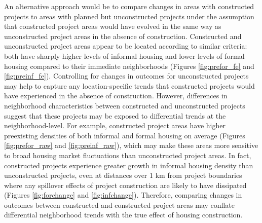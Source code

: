 \documentclass[12pt]{article}
\begin{document}
An alternative approach would be to compare changes in areas with constructed projects to areas with planned but unconstructed projects under the assumption that constructed project areas would have evolved in the same way as unconstructed project areas in the absence of construction.  Constructed and unconstructed project areas appear to be located according to similar criteria: both have sharply higher levels of informal housing and lower levels of formal housing compared to their immediate neighborhoods (Figures \ref{fig:prefor_fe} and \ref{fig:preinf_fe}).  Controlling for changes in outcomes for unconstructed projects may help to capture any location-specific trends that constructed projects would have experienced in the absence of construction.  However,  differences in neighborhood characteristics between constructed and unconstructed projects suggest that these projects may be exposed to differential trends at the neighborhood-level.  For example, constructed project areas have higher preexisting densities of both informal and formal housing on average (Figures \ref{fig:prefor_raw} and \ref{fig:preinf_raw}), which may make these areas more sensitive to broad housing market fluctuations than unconstructed project areas.  In fact, constructed projects experience greater growth in informal housing density than unconstructed projects, even at distances over 1 km from project boundaries where any spillover effects of project construction are likely to have dissipated (Figures \ref{fig:forchange} and \ref{fig:infchange}).  Therefore, comparing changes in outcomes between constructed and constructed project areas may conflate differential neighborhood trends with the true effect of housing construction.
\end{document}
